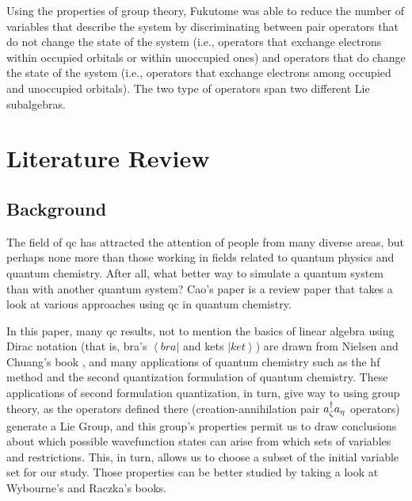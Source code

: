 \documentclass{aux/ttuthes2007}
\newcommand{\bra}[1]{\ensuremath{\left\langle#1\right\vert}}
\newcommand{\ket}[1]{\ensuremath{\left|#1\right\rangle}}
\newcommand{\anig}[1]{a_{\go{#1}}}
\newcommand{\creg}[1]{a^\dagger_{\go{#1}}}
\newcommand{\go}[1]{
		\IfEqCase{#1}{
			{0}{\zeta}
			{1}{\eta}
			{2}{\iota}
			{3}{\kappa}
		}[\PackageError{unocorb}{Undefined option to go: #1}{}]
}
\begin{document}
Using the properties of group theory, Fukutome  was able to reduce the number of variables that describe the system by
discriminating between pair operators that do not change the state of the system (i.e., operators that exchange electrons within occupied orbitals or within unoccupied ones) and operators that do change the state of the system (i.e., operators that exchange electrons among occupied and unoccupied orbitals). The two type of operators span two different Lie subalgebras.



\chapter{\textbf{Literature Review}}\label{chap:literature}

\section{\textbf{Background}}
The field of \gls{qc} has attracted the attention of people from many diverse areas, but perhaps none more than those working in fields related to quantum physics and quantum chemistry. After all, what better way to simulate a quantum system than with another quantum system? Cao's paper  is a review paper that takes a look at various approaches using \gls{qc} in quantum chemistry.

	In this paper, many \gls{qc} results, not to mention the basics of linear algebra using Dirac notation (that is, bra's $\bra {bra}$ and kets $\ket{ket}$) are drawn from Nielsen and Chuang's book \cite{nielsen}, and many applications of quantum chemistry such as the \gls{hf} method and the second quantization formulation of quantum chemistry.
	These applications of second formulation quantization, in turn, give way to using group theory, as the operators defined there (creation-annihilation pair $\creg 0\anig 1$ operators) generate a Lie Group, and this group's properties permit us to draw conclusions about which possible wavefunction states can arise from which sets of variables and restrictions. This, in turn, allows us to choose a subset of the initial variable set for our study. Those properties can be better studied by taking a look at Wybourne's  and Raczka's  books.
	
\end{document}
